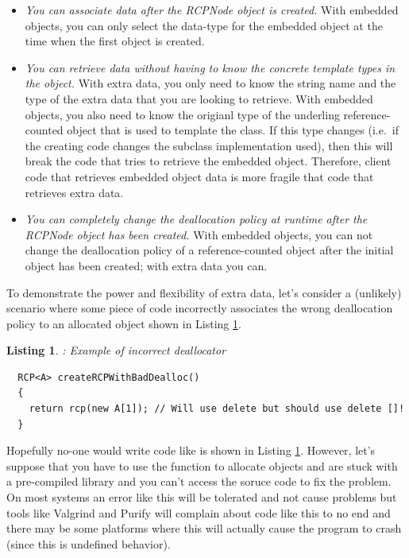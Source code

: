 \documentclass[pdf,ps2pdf,11pt]{SANDreport}
\newtheorem{listing}{Listing}
\begin{document}
\begin{itemize}

{}\item\textit{You can associate data after the RCPNode object is
created.}  With embedded objects, you can only select the data-type
for the embedded object at the time when the first {}
object is created.

{}\item\textit{You can retrieve data without having to know the
concrete template types in the {} object.}  With
extra data, you only need to know the string name and the type of the
extra data that you are looking to retrieve.  With embedded objects,
you also need to know the origianl type of the underling
reference-counted object that is used to template the
{} class.  If this type changes (i.e.\ if the
creating code changes the subclass implementation used), then this
will break the code that tries to retrieve the embedded object.
Therefore, client code that retrieves embedded object data is more
fragile that code that retrieves extra data.

{}\item\textit{You can completely change the deallocation policy at
runtime after the RCPNode object has been created.}  With embedded
objects, you can not change the deallocation policy of a
reference-counted object after the initial {}
object has been created; with extra data you can.

\end{itemize}

To demonstrate the power and flexibility of extra data, let's consider
a (unlikely) scenario where some piece of code incorrectly associates
the wrong deallocation policy to an allocated object shown in Listing
{}\ref{listing:createRCPWithBadDealloc}.

\begin{listing}: Example of incorrect deallocator \\
\label{listing:createRCPWithBadDealloc}
{\small\begin{verbatim}
  RCP<A> createRCPWithBadDealloc()
  {
    return rcp(new A[1]); // Will use delete but should use delete []!
  }
\end{verbatim}}
\end{listing}

Hopefully no-one would write code like is shown in Listing
{}\ref{listing:createRCPWithBadDealloc}.  However, let's suppose that
you have to use the function {} to
allocate {} objects and are stuck with a pre-compiled
library and you can't access the soruce code to fix the problem.  On
most systems an error like this will be tolerated and not cause
problems but tools like Valgrind and Purify will complain about code
like this to no end and there may be some platforms where this will
actually cause the program to crash (since this is undefined
behavior).
\end{document}
